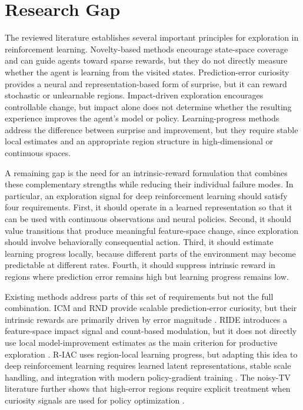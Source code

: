 \section{Research Gap}
\label{sec:research_gap}

The reviewed literature establishes several important principles for exploration in reinforcement learning.
Novelty-based methods encourage state-space coverage and can guide agents toward sparse rewards, but they do not directly measure whether the agent is learning from the visited states.
Prediction-error curiosity provides a neural and representation-based form of surprise, but it can reward stochastic or unlearnable regions.
Impact-driven exploration encourages controllable change, but impact alone does not determine whether the resulting experience improves the agent's model or policy.
Learning-progress methods address the difference between surprise and improvement, but they require stable local estimates and an appropriate region structure in high-dimensional or continuous spaces.

A remaining gap is the need for an intrinsic-reward formulation that combines these complementary strengths while reducing their individual failure modes.
In particular, an exploration signal for deep reinforcement learning should satisfy four requirements.
First, it should operate in a learned representation so that it can be used with continuous observations and neural policies.
Second, it should value transitions that produce meaningful feature-space change, since exploration should involve behaviorally consequential action.
Third, it should estimate learning progress locally, because different parts of the environment may become predictable at different rates.
Fourth, it should suppress intrinsic reward in regions where prediction error remains high but learning progress remains low.

Existing methods address parts of this set of requirements but not the full combination.
ICM and RND provide scalable prediction-error curiosity, but their intrinsic rewards are primarily driven by error magnitude \parencite{pathak-2017,burda-2018B}.
RIDE introduces a feature-space impact signal and count-based modulation, but it does not directly use local model-improvement estimates as the main criterion for productive exploration \parencite{raileanu-2020}.
R-IAC uses region-local learning progress, but adapting this idea to deep reinforcement learning requires learned latent representations, stable scale handling, and integration with modern policy-gradient training \parencite{baranes-2009}.
The noisy-TV literature further shows that high-error regions require explicit treatment when curiosity signals are used for policy optimization \parencite{mavor-parker-2021}.

